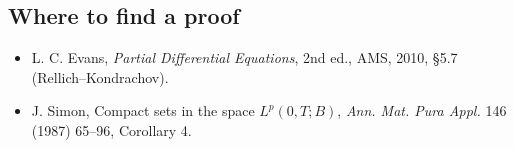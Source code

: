 \subsection*{Where to find a proof}

\begin{itemize}
\item L. C. Evans, \emph{Partial Differential Equations}, 2nd ed., AMS, 2010, §5.7 (Rellich--Kondrachov).
\item J. Simon, Compact sets in the space $L^p(0,T;B)$, \emph{Ann. Mat. Pura Appl.} 146 (1987) 65--96, Corollary 4.
\end{itemize}

\neededfor
